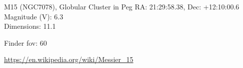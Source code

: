 \begin{block}{M15 (NGC7078), Globular Cluster in Peg}
    RA: 21:29:58.38, Dec: +12:10:00.6 \\ 
    Magnitude (V): 6.3 \\ 
    Dimensions: 11.1 

    Finder fov: 60 

    \url{https://en.wikipedia.org/wiki/Messier_15} 
\end{block}